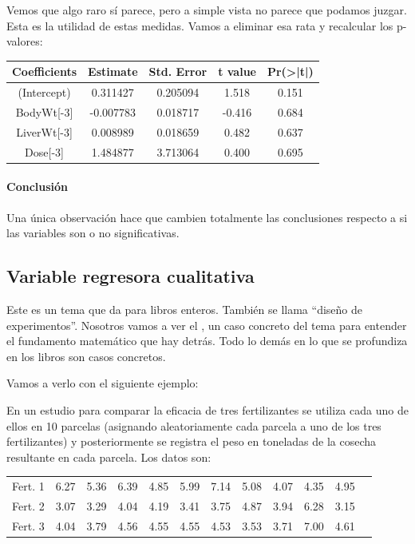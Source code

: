 Vemos que algo raro sí parece, pero a simple vista no parece que podamos juzgar. Esta es la utilidad de estas medidas. Vamos a eliminar esa rata y recalcular los p-valores:

\begin{center}
\begin{tabular}{ccccc}
Coefficients&Estimate&Std. Error&t value&Pr(>|t|)\\\hline
(Intercept)&0.311427&0.205094&1.518&0.151\\
BodyWt[-3]&-0.007783&0.018717&-0.416&0.684\\
LiverWt[-3]&0.008989&0.018659&0.482&0.637\\
Dose[-3]&1.484877&3.713064&0.400&0.695
\end{tabular}
\end{center}

\paragraph{Conclusión}
Una única observación hace que cambien totalmente las conclusiones respecto a si las variables son o no significativas.


\subsection{Variable regresora cualitativa}

Este es un tema que da para libros enteros. También se llama ``diseño de experimentos''. Nosotros vamos a ver el , un caso concreto del tema para entender el fundamento matemático que hay detrás. Todo lo demás en lo que se profundiza en los libros son casos concretos.

Vamos a verlo con el siguiente ejemplo:

En un estudio para comparar la eficacia de tres fertilizantes se utiliza
cada uno de ellos en 10 parcelas (asignando aleatoriamente cada parcela
a uno de los tres fertilizantes) y posteriormente se registra el peso en
toneladas de la cosecha resultante en cada parcela. Los datos son:

\begin{center}
\begin{tabular}{|c|ccccccccccc|}
\hline
	Fert. 1 & 6.27 & 5.36 & 6.39 & 4.85 & 5.99 & 7.14 & 5.08 & 4.07 & 4.35 & 4.95\\
	Fert. 2 & 3.07 & 3.29 & 4.04 & 4.19 & 3.41 & 3.75 & 4.87 & 3.94 & 6.28 & 3.15\\
	Fert. 3 & 4.04 & 3.79 & 4.56 & 4.55 & 4.55 & 4.53 & 3.53 & 3.71 & 7.00 & 4.61\\\hline
\end{tabular}
\end{center}



